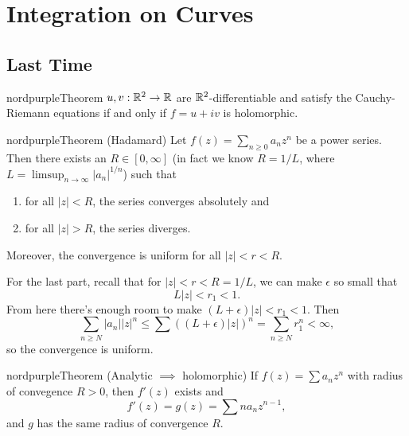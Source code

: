 \chapter{Integration on Curves}

\section{Last Time}
\begin{mybox}{nordpurple}{Theorem}
  $u, v : \mathbb{R}^2 \to \mathbb{R}$ are $\mathbb{R}^2$-differentiable and
  satisfy the Cauchy-Riemann equations if and only
  if $f = u + iv$ is holomorphic.
\end{mybox}

\begin{mybox}{nordpurple}{Theorem (Hadamard)}
   Let $f(z) = \sum_{n \ge 0} a_n z^n$ be a power series.
   Then there exists an $R \in [0, \infty]$ (in fact we
   know $R = 1 / L$, where $L = \limsup_{n \to \infty} {|a_n|}^{1 / n}$)
   such that
   \begin{enumerate}
     \item for all $|z| < R$, the series converges
       absolutely and
     \item for all $|z| > R$, the series diverges.
   \end{enumerate}
   Moreover, the convergence is uniform for all
   $|z| < r < R$.
\end{mybox}

For the last part, recall that for
$|z| < r < R = 1 / L$, we can make $\epsilon$ so small
that
\[L|z| < r_1 < 1.\]
From here there's enough room to make
$(L + \epsilon)|z| < r_1 < 1$. Then
\[
  \sum_{n \ge N} |a_n| |z|^n \le \sum ((L + \epsilon)|z|)^n
  = \sum_{n \ge N} r_1^n < \infty,
\]
so the convergence is uniform.

\begin{mybox}{nordpurple}{Theorem (Analytic $\implies$ holomorphic)}
  If $f(z) = \sum a_n z^n$ with radius of convegence
  $R > 0$, then $f'(z)$ exists and
  \[f'(z) = g(z) = \sum n a_n z^{n - 1},\]
  and $g$ has the same radius of convergence $R$.
\end{mybox}

